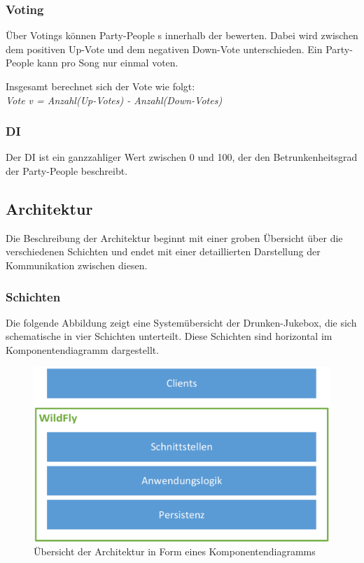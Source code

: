 \subsubsection{Voting}
\label{sec:Voting}
Über Votings können Party-People s innerhalb der  bewerten. Dabei wird zwischen dem positiven Up-Vote und dem negativen Down-Vote unterschieden. Ein Party-People kann pro Song nur einmal voten.

Insgesamt berechnet sich der Vote wie folgt:\\
\textit{Vote v = Anzahl(Up-Votes) - Anzahl(Down-Votes)}

\subsubsection{DI}
\label{sec:DI}
Der DI ist ein ganzzahliger Wert zwischen 0 und 100, der den Betrunkenheitsgrad der Party-People beschreibt.

\subsection{Architektur}
\label{sec:Architektur}
Die Beschreibung der Architektur beginnt mit einer groben Übersicht über die verschiedenen Schichten und endet mit einer detaillierten Darstellung der Kommunikation zwischen diesen.

\subsubsection{Schichten}
Die folgende Abbildung zeigt eine Systemübersicht der Drunken-Jukebox, die sich schematische in vier Schichten unterteilt. Diese Schichten sind horizontal im Komponentendiagramm dargestellt.

\begin{figure}[H]
	\centering
	\includegraphics[width=0.75\linewidth]{Bilder/Architektur}
	\caption{Übersicht der Architektur in Form eines Komponentendiagramms}
	\label{fig:Architekturdiagramm}
\end{figure}

